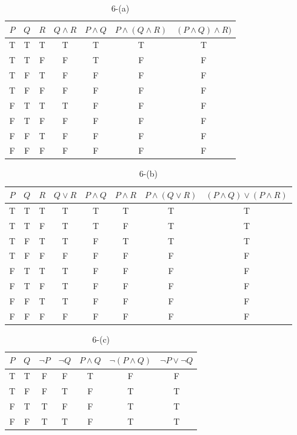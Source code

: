 \documentclass{article}
\begin{document}
	\begin{table}[h]
	\centering
	\caption{6-(a)}
	\begin{tabular}{|c|c|c|c|c|c|c|}
	\hline
	$P$ & $Q$ & $R$ & $Q \land R$ & $P \land Q$ & $P \land (Q \land R)$ & $(P \land Q) \land R)$\\ \hline
	T & T & T & T & T & T & T  \\ \hline
	T & T & F & F & T & F & F  \\ \hline
	T & F & T & F & F & F & F  \\ \hline
	T & F & F & F & F & F & F  \\ \hline
	F & T & T & T & F & F & F  \\ \hline
	F & T & F & F & F & F & F  \\ \hline
	F & F & T & F & F & F & F  \\ \hline
	F & F & F & F & F & F & F  \\ \hline
	\end{tabular}
	\end{table}



	\begin{table}[h]
	\centering
	\caption{6-(b)}
	\begin{tabular}{|c|c|c|c|c|c|c|c|}
	\hline
	$P$ & $Q$ & $R$ & $Q \lor R$ & $P \land Q$ & $P \land R$ & $P \land (Q \lor R)$ & $(P \land Q) \lor (P \land R)$\\ \hline
	T & T & T & T & T & T & T & T  \\ \hline
	T & T & F & T & T & F & T & T  \\ \hline
	T & F & T & T & F & T & T & T  \\ \hline
	T & F & F & F & F & F & F & F  \\ \hline
	F & T & T & T & F & F & F & F  \\ \hline
	F & T & F & T & F & F & F & F  \\ \hline
	F & F & T & T & F & F & F & F  \\ \hline
	F & F & F & F & F & F & F & F  \\ \hline
	\end{tabular}
	\end{table}



	\begin{table}[h]
	\centering
	\caption{6-(c)}
	\begin{tabular}{|c|c|c|c|c|c|c|}
	\hline
	$P$ & $Q$ & $\neg P$ & $\neg Q$ & $P \land Q$ & $\neg(P \land Q)$ & $\neg P \lor \neg Q$\\ \hline
	T & T & F & F & T & F & F \\ \hline
	T & F & F & T & F & T & T \\ \hline
	F & T & T & F & F & T & T \\ \hline
	F & F & T & T & F & T & T \\ \hline
	\end{tabular}
	\end{table}	
\end{document}
